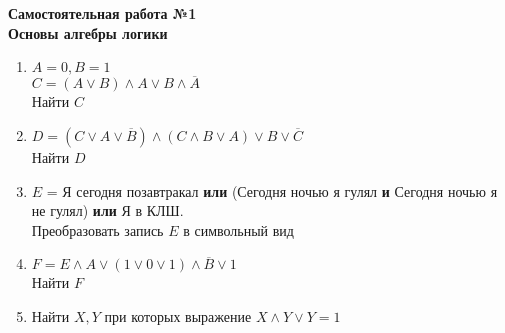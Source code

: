 



    \begin{center}
        \textbf{
            Самостоятельная работа №1\\
            Основы алгебры логики}
    \end{center}

    \begin{enumerate}
        \item $A = 0, B = 1$\\
        $C = (A \vee B) \wedge A \vee B \wedge \overline A$\\
        Найти $C$

        \item $D = (C \vee A \vee \overline B) \wedge (C \wedge B \vee A) \vee B \vee \overline C$\\
        Найти $D$

        \item $E$ = Я сегодня позавтракал \textbf{или} (Сегодня ночью я гулял \textbf{и} Сегодня ночью я не гулял) \textbf{или} Я в КЛШ.\\
        Преобразовать запись $E$ в символьный вид

        \item $F = E \wedge A \vee (1 \vee 0 \vee 1) \wedge \overline B \vee 1$\\
        Найти $F$

        \item Найти $X, Y$ при которых выражение $X \wedge Y \vee Y = 1$
    \end{enumerate}


